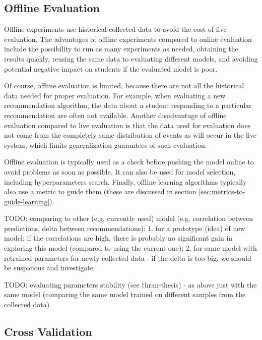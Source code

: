 \subsection{Offline Evaluation}

Offline experiments use historical collected data
  to avoid the cost of live evaluation.
The advantages of offline experiments compared to online evaluation include
  the possibility to run as many experiments as needed,
  obtaining the results quickly,
  reusing the same data to evaluating different models,
  and avoiding potential negative impact on students if the evaluated model is poor.

Of course, offline evaluation is limited,
  because there are not all the historical data needed
  for proper evaluation.
For example, when evaluating a new recommendation algorithm,
  the data about a student responding to a particular recommendation
  are often not available.
Another disadvantage of offline evaluation compared to live evaluation
  is that the data used for evaluation does not come from the completely
  same distribution of events as will occur in the live system,
  which limits generalization guarantees of such evaluation.

Offline evaluation is typically used as a check before pushing
  the model online to avoid problems as soon as possible.
It can also be used for model selection,
  including hyperparameters search.
Finally, offline learning algorithms typically also use
  a metric to guide them
  (these are discussed in section \ref{sec:metrics-to-guide-learning}).


TODO: comparing to other (e.g. currently used) model (e.g. correlation between predictions, delta between recommendations):
1. for a prototype (idea) of new model: if the correlations are high, there is probably no significant gain in exploring this model (compared to using the current one);
2. for same model with retrained parameters for newly collected data - if the delta is too big, we should be suspicious and investigate.

TODO: evaluating parameters stability (see thran-thesis) - as above just with the same model (comparing the same model trained on different samples from the collected data)

\subsection{Cross Validation}

